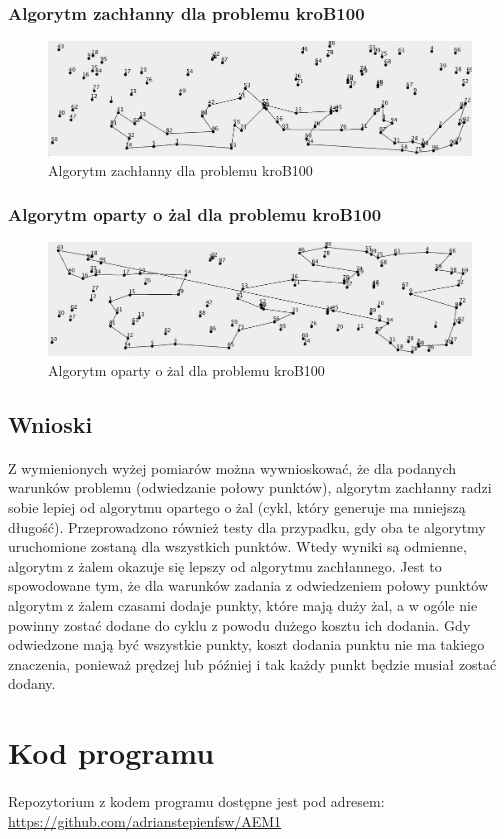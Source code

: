 \documentclass[a4paper]{article}
\begin{document}
\subsubsection{Algorytm zachłanny dla problemu kroB100}

\begin{figure}[H]
\centering
\includegraphics[width=\textwidth]{lab1/kroB_greedy}
\caption{Algorytm zachłanny dla problemu kroB100}
\end{figure}

\subsubsection{Algorytm oparty o żal dla problemu kroB100}

\begin{figure}[H]
\centering
\includegraphics[width=\textwidth]{lab1/kroB_regret}
\caption{Algorytm oparty o żal dla problemu kroB100}
\end{figure}

\subsection{Wnioski}
\paragraph{}
Z wymienionych wyżej pomiarów można wywnioskować, że dla podanych warunków problemu (odwiedzanie połowy punktów), algorytm zachłanny radzi sobie lepiej od algorytmu opartego o żal (cykl, który generuje ma mniejszą długość). Przeprowadzono również testy dla przypadku, gdy oba te algorytmy uruchomione zostaną dla wszystkich punktów. Wtedy wyniki są odmienne, algorytm z żalem okazuje się lepszy od algorytmu zachłannego. Jest to spowodowane tym, że dla warunków zadania z odwiedzeniem połowy punktów algorytm z żalem czasami dodaje punkty, które mają duży żal, a w ogóle nie powinny zostać dodane do cyklu z powodu dużego kosztu ich dodania. Gdy odwiedzone mają być wszystkie punkty, koszt dodania punktu nie ma takiego znaczenia, ponieważ prędzej lub później i tak każdy punkt będzie musiał zostać dodany.

\section{Kod programu}
\paragraph{}
Repozytorium z kodem programu dostępne jest pod adresem: \url{https://github.com/adrianstepienfsw/AEM1}
\end{document}
